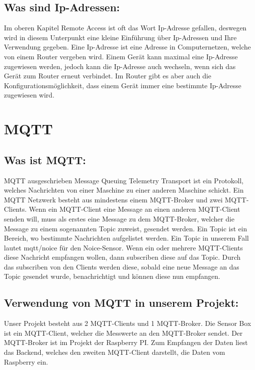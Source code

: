  \subsection{Was sind Ip-Adressen:}
Im oberen Kapitel Remote Access ist oft das Wort Ip-Adresse gefallen, deswegen wird in diesem Unterpunkt eine kleine Einführung über Ip-Adressen und Ihre Verwendung gegeben. 
Eine Ip-Adresse ist eine Adresse in Computernetzen, welche von einem Router vergeben wird.
 Einem Gerät kann maximal eine Ip-Adresse zugewiesen werden, jedoch kann die Ip-Adresse auch wechseln, wenn sich das Gerät zum Router erneut verbindet. 
 Im Router gibt es aber auch die Konfigurationsmöglichkeit, dass einem Gerät immer eine bestimmte Ip-Adresse zugewiesen wird. 






\section{MQTT}

\subsection{Was ist MQTT:}
MQTT ausgeschrieben Message Queuing  Telemetry Transport ist ein Protokoll, welches Nachrichten von einer Maschine zu einer anderen Maschine schickt. 
Ein MQTT Netzwerk besteht  aus mindestens einem MQTT-Broker und zwei MQTT-Clients. 
Wenn ein MQTT-Client eine Message an einen anderen MQTT-Client senden will, muss als erstes eine Message zu dem MQTT-Broker, welcher die Message zu einem sogenannten Topic zuweist, gesendet werden.
Ein Topic ist ein Bereich, wo bestimmte Nachrichten aufgelistet werden. 
Ein Topic in unserem Fall lautet mqtt/noice für den Noice-Sensor.  
Wenn ein oder mehrere MQTT-Clients diese Nachricht empfangen wollen, dann subscriben diese auf das Topic. 
Durch das subscriben von den Clients werden diese, sobald eine neue Message an das Topic gesendet wurde, benachrichtigt und können diese nun empfangen. 

\subsection {Verwendung von MQTT in unserem Projekt:}
Unser Projekt besteht aus 2 MQTT-Clients und 1 MQTT-Broker. 
Die Sensor Box ist ein MQTT-Client, welcher die Messwerte an den MQTT-Broker sendet. 
Der MQTT-Broker ist im Projekt der Raspberry PI. 
Zum Empfangen der Daten liest das Backend, welches den zweiten MQTT-Client darstellt, die Daten vom Raspberry ein.

